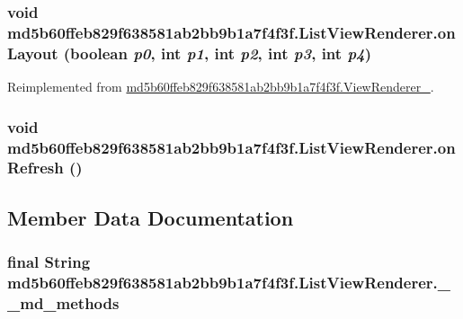 \hypertarget{classmd5b60ffeb829f638581ab2bb9b1a7f4f3f_1_1_list_view_renderer_aab562eda2712d67615715b8aa3d00c7}{
\subsubsection[{onLayout}]{\setlength{\rightskip}{0pt plus 5cm}void md5b60ffeb829f638581ab2bb9b1a7f4f3f.ListViewRenderer.onLayout (boolean {\em p0}, \/  int {\em p1}, \/  int {\em p2}, \/  int {\em p3}, \/  int {\em p4})}}
\label{classmd5b60ffeb829f638581ab2bb9b1a7f4f3f_1_1_list_view_renderer_aab562eda2712d67615715b8aa3d00c7}




Reimplemented from \hyperlink{classmd5b60ffeb829f638581ab2bb9b1a7f4f3f_1_1_view_renderer__2_0b758be41e41d3577cadf82bc8d004b6}{md5b60ffeb829f638581ab2bb9b1a7f4f3f.ViewRenderer\_}.\hypertarget{classmd5b60ffeb829f638581ab2bb9b1a7f4f3f_1_1_list_view_renderer_8dd7354cec7536410158693968e43b0f}{
\subsubsection[{onRefresh}]{\setlength{\rightskip}{0pt plus 5cm}void md5b60ffeb829f638581ab2bb9b1a7f4f3f.ListViewRenderer.onRefresh ()}}
\label{classmd5b60ffeb829f638581ab2bb9b1a7f4f3f_1_1_list_view_renderer_8dd7354cec7536410158693968e43b0f}




\subsection{Member Data Documentation}
\hypertarget{classmd5b60ffeb829f638581ab2bb9b1a7f4f3f_1_1_list_view_renderer_d5546d58609fec476ca441ccf586e954}{
\subsubsection[{\_\-\_\-md\_\-methods}]{\setlength{\rightskip}{0pt plus 5cm}final String {\bf md5b60ffeb829f638581ab2bb9b1a7f4f3f.ListViewRenderer.\_\-\_\-md\_\-methods}}}
\label{classmd5b60ffeb829f638581ab2bb9b1a7f4f3f_1_1_list_view_renderer_d5546d58609fec476ca441ccf586e954}




